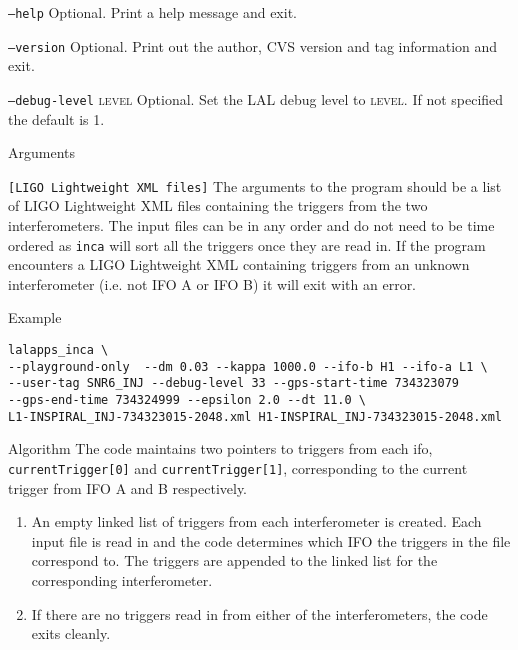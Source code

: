 \begin{entry}
\begin{entry}
\item[\texttt{--help}] Optional.  Print a help message and exit.

\item[\texttt{--version}] Optional.  Print out the author, CVS version and
tag information and exit.

\item[\texttt{--debug-level} \textsc{level}] Optional. Set the LAL debug
level to \textsc{level}. If not specified the default is 1.

\end{entry}

\item[Arguments]\leavevmode
\begin{entry}
\item[\texttt{[LIGO Lightweight XML files]}] The arguments to the program
should be a list of LIGO Lightweight XML files containing the triggers from
the two interferometers. The input files can be in any order and do not need
to be time ordered as \texttt{inca} will sort all the triggers once they are
read in. If the program encounters a LIGO Lightweight XML containing triggers
from an unknown interferometer (i.e. not IFO A or IFO B) it will exit with an
error.
\end{entry}

\item[Example]
\begin{verbatim}
lalapps_inca \
--playground-only  --dm 0.03 --kappa 1000.0 --ifo-b H1 --ifo-a L1 \
--user-tag SNR6_INJ --debug-level 33 --gps-start-time 734323079
--gps-end-time 734324999 --epsilon 2.0 --dt 11.0 \
L1-INSPIRAL_INJ-734323015-2048.xml H1-INSPIRAL_INJ-734323015-2048.xml
\end{verbatim}

\item[Algorithm]
The code maintains two pointers to triggers from each ifo,
\texttt{currentTrigger[0]} and \texttt{currentTrigger[1]}, corresponding to
the current trigger from IFO A and B respectively.

\begin{enumerate}
\item An empty linked list of triggers from each interferometer is created.
Each input file is read in and the code determines which IFO the triggers in
the file correspond to. The triggers are appended to the linked list for the
corresponding interferometer.

\item If there are no triggers read in from either of the interferometers,
the code exits cleanly.


\end{enumerate}
\end{entry}
